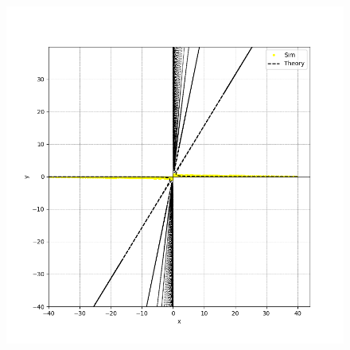 \documentclass{beamer}
\theoremstyle{remark}
\numberwithin{equation}{section}
\begin{document}
\begin{frame}
	\begin{figure}[h]
		\centering
		\includegraphics[width=0.8\linewidth]{figs/figb.png}
		\caption{}
		\label{graph3}
	\end{figure}
\end{frame}
\end{document}

